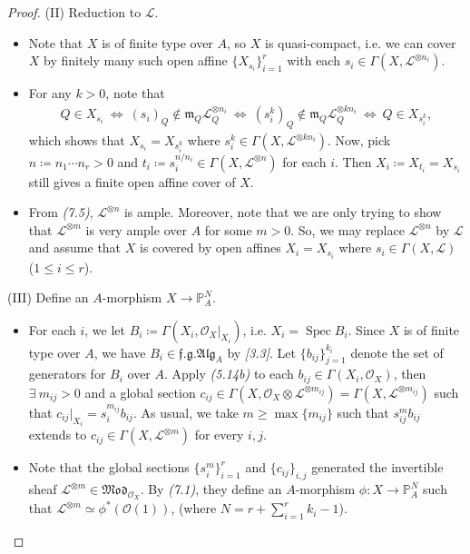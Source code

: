 \documentclass[11pt,a4paper,footinclude=true,headinclude=true]{scrbook} %
\DeclareMathOperator{\Spec}{Spec}
\newcommand{\LL}{\mathscr{L}}
\newcommand{\OO}{\mathcal{O}}
\newcommand{\PP}{\mathbb{P}}
\newcommand{\mm}{\mathfrak{m}}
\newcommand{\<}{\langle}
\newcommand{\>}{\rangle}
\newcommand{\fg}{\mathfrak{f.g.}}
\newcommand{\MOD}{\mathfrak{Mod}}
\newcommand{\ALG}{\mathfrak{Alg}}
\begin{document}
\begin{proof}
    (II) Reduction to $\LL$.
    \begin{itemize}
            \item Note that $X$ is of finite type over $A$, so $X$ is quasi-compact, i.e. we can cover $X$ by finitely many such open affine $\{X_{s_i}\}_{i=1}^r$ with each $s_i\in\Gamma(X,\LL^{\otimes n_i})$.
            \item For any $k>0$, note that 
            \begin{align*}
                Q\in X_{s_i}\ \Longleftrightarrow\ (s_i)_Q\notin\mm_Q\LL_Q^{\otimes n_i}\ \Longleftrightarrow\ (s_i^k)_Q\notin\mm_Q\LL_Q^{\otimes kn_i}\ \Longleftrightarrow\ Q\in X_{s_i^k},
            \end{align*}
            which shows that $X_{s_i}=X_{s_i^k}$ where $s_i^k\in\Gamma(X,\LL^{\otimes kn_i})$. Now, pick $n\coloneqq n_1\cdots n_r>0$ and $t_i\coloneqq s_i^{n/n_i}\in\Gamma(X,\LL^{\otimes n})$ for each $i$. Then $X_i\coloneqq X_{t_i}=X_{s_i}$ still gives a finite open affine cover of $X$.
            \item From \textit{(7.5)}, $\LL^{\otimes n}$ is ample. Moreover, note that we are only trying to show that $\LL^{\otimes m}$ is very ample over $A$ for some $m>0$. So, we may replace $\LL^{\otimes n}$ by $\LL$ and assume that $X$ is covered by open affines $X_i=X_{s_i}$ where $s_i\in\Gamma(X,\LL)$ ($1\leq i \leq r$).
        \end{itemize}
    
    (III) Define an $A$-morphism $X\to\PP_A^N$.
    \begin{itemize}
        \item For each $i$, we let $B_i\coloneqq\Gamma(X_i,\OO_X|_{X_i})$, i.e. $X_i=\Spec B_i$. Since $X$ is of finite type over $A$, we have $B_i\in\fg\ALG_A$ by \textit{[3.3]}. Let $\{b_{ij}\}_{j=1}^{k_i}$ denote the set of generators for $B_i$ over $A$. Apply \textit{(5.14b)} to each $b_{ij}\in\Gamma(X_i,\OO_X)$, then $\exists\ m_{ij}>0$ and a global section $c_{ij}\in\Gamma(X,\OO_X\otimes\LL^{\otimes m_{ij}})=\Gamma(X,\LL^{\otimes m_{ij}})$ such that $c_{ij}|_{X_i}=s_i^{m_{ij}}b_{ij}$. As usual, we take $m\geq\max\{m_{ij}\}$ such that $s_{ij}^mb_{ij}$ extends to $c_{ij}\in\Gamma(X,\LL^{\otimes m})$ for every $i,j$.
        \item Note that the global sections $\{s_i^{m}\}_{i=1}^r$ and $\{c_{ij}\}_{i,j}$ generated the invertible sheaf $\LL^{\otimes m}\in\MOD_{\OO_X}$. By \textit{(7.1)}, they define an $A$-morphism $\phi:X\to\PP_A^N$ such that $\LL^{\otimes m}\simeq\phi^\ast(\OO(1))$, (where $N=r+\sum_{i=1}^rk_i-1$).
    \end{itemize}
    

\end{proof}
\end{document}
